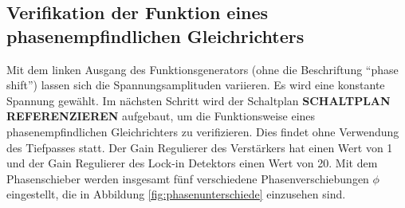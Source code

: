 %
%
%
%
%
%
\subsection[]{Verifikation der Funktion eines phasenempfindlichen Gleichrichters}
Mit dem linken Ausgang des Funktionsgenerators (ohne die Beschriftung \enquote{phase shift}) lassen sich die Spannungsamplituden variieren.
Es wird eine konstante Spannung gewählt.
%
Im nächsten Schritt wird der Schaltplan \textbf{SCHALTPLAN REFERENZIEREN} aufgebaut,
um die Funktionsweise eines phasenempfindlichen Gleichrichters zu verifizieren.
Dies findet ohne Verwendung des Tiefpasses statt.
Der Gain Regulierer des Verstärkers hat einen Wert von 1 und der Gain Regulierer des Lock-in Detektors einen Wert von 20.
Mit dem Phasenschieber werden insgesamt fünf verschiedene Phasenverschiebungen $\phi$ eingestellt,
die in Abbildung \ref{fig:phasenunterschiede} einzusehen sind.
%
